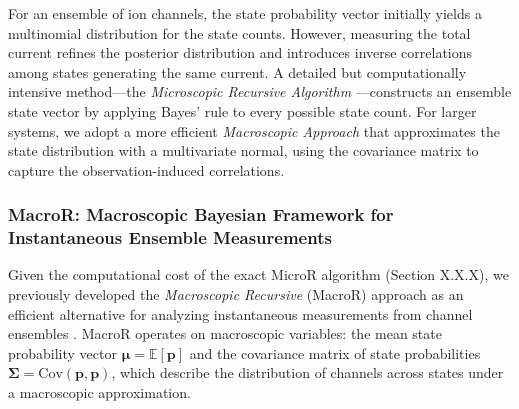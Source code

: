 \documentclass[9pt]{elife}
\begin{document}
	For an ensemble of ion channels, the state probability vector initially yields a multinomial distribution for the state counts. However, measuring the total current refines the posterior distribution and introduces inverse correlations among states generating the same current. A detailed but computationally intensive method—the \textit{Microscopic Recursive Algorithm} \cite{Moffatt}—constructs an ensemble state vector by applying Bayes’ rule to every possible state count. For larger systems, we adopt a more efficient \textit{Macroscopic Approach} that approximates the state distribution with a multivariate normal, using the covariance matrix to capture the observation-induced correlations.
	
	\subsubsection{MacroR: Macroscopic Bayesian Framework for Instantaneous Ensemble Measurements}
	
	Given the computational cost of the exact MicroR algorithm (Section X.X.X), we previously developed the \textit{Macroscopic Recursive} (MacroR) approach as an efficient alternative for analyzing instantaneous measurements from channel ensembles \cite{Moffatt}. MacroR operates on macroscopic variables: the mean state probability vector \( \boldsymbol{\mu} = \mathbb{E}[\boldsymbol{p}] \) and the covariance matrix of state probabilities \( \boldsymbol{\Sigma} = \text{Cov}(\boldsymbol{p}, \boldsymbol{p}) \), which describe the distribution of channels across states under a macroscopic approximation. 
	
\end{document}
